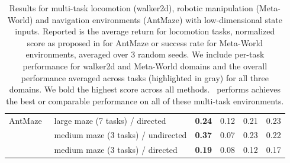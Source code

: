 \begin{table}[t!]
\begin{tabular}{l|l|r|r|r|r}
AntMaze~\citep{fu2020d4rl}  & large maze (7 tasks) / directed & \textbf{0.24} & 0.12 & 0.21 & 0.23 \\
& medium maze (3 tasks) / undirected & \textbf{0.37} & 0.07 & 0.23 & 0.22\\
& medium maze (3 tasks) / directed & \textbf{0.19} & 0.08 & 0.12 & 0.17 \\
\bottomrule
\end{tabular}
\vspace{-0.2cm}
\caption{\footnotesize Results for multi-task locomotion (walker2d), robotic manipulation (Meta-World) and navigation environments (AntMaze) with low-dimensional state inputs.
Reported is the average return for locomotion tasks, normalized score as proposed in \citep{fu2020d4rl} for AntMaze or success rate for Meta-World environments, averaged over 3 random seeds. We include per-task performance for walker2d and Meta-World domains and the overall performance averaged across tasks (highlighted in gray) for all three domains. We bold the highest score across all methods. \methodname\ performs achieves the best or comparable performance on all of these multi-task environments.
}
\label{tbl:gym}
\normalsize
\vspace{-0.8cm}
\end{table}



